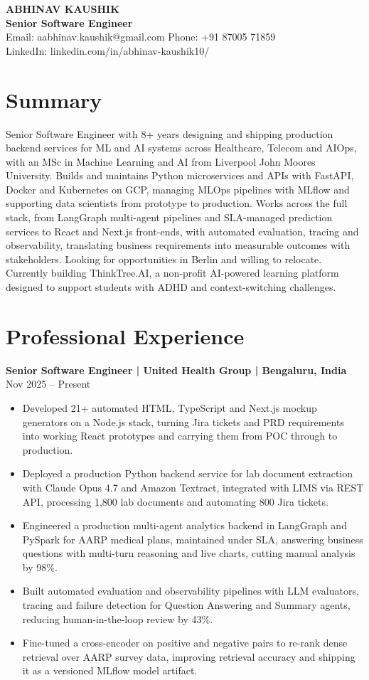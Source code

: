 \documentclass[10pt,a4paper]{article}
\newcommand{\role}[2]{\textbf{#1} \hfill #2\par}
\begin{document}
\begin{center}
  {\Large\bfseries ABHINAV KAUSHIK}\\[1pt]
  \textbf{Senior Software Engineer}\\[1pt]
  Email: aabhinav.kaushik@gmail.com \quad Phone: +91 87005 71859\\
  LinkedIn: linkedin.com/in/abhinav-kaushik10/
\end{center}

\section{Summary}
Senior Software Engineer with 8+ years designing and shipping production backend services for ML and AI systems
across Healthcare, Telecom and AIOps, with an MSc in Machine Learning and AI from Liverpool John Moores University.
Builds and maintains Python microservices and APIs with FastAPI, Docker and Kubernetes on GCP, managing MLOps
pipelines with MLflow and supporting data scientists from prototype to production. Works across the full stack, from
LangGraph multi-agent pipelines and SLA-managed prediction services to React and Next.js front-ends, with automated
evaluation, tracing and observability, translating business requirements into measurable outcomes with stakeholders. Looking for
opportunities in Berlin and willing to relocate. Currently building ThinkTree.AI, a non-profit AI-powered learning
platform designed to support students with ADHD and context-switching challenges.

\section{Professional Experience}
\role{Senior Software Engineer | United Health Group | Bengaluru, India}{Nov 2025 -- Present}
\begin{itemize}
  \item Developed 21+ automated HTML, TypeScript and Next.js mockup generators on a Node.js stack, turning Jira
  tickets and PRD requirements into working React prototypes and carrying them from POC through to production.
  \item Deployed a production Python backend service for lab document extraction with Claude Opus 4.7 and Amazon
  Textract, integrated with LIMS via REST API, processing 1,800 lab documents and automating 800 Jira tickets.
  \item Engineered a production multi-agent analytics backend in LangGraph and PySpark for AARP medical plans,
  maintained under SLA, answering business questions with multi-turn reasoning and live charts, cutting manual
  analysis by 98\%.
  \item Built automated evaluation and observability pipelines with LLM evaluators, tracing and failure detection
  for Question Answering and Summary agents, reducing human-in-the-loop review by 43\%.
  \item Fine-tuned a cross-encoder on positive and negative pairs to re-rank dense retrieval over AARP survey data,
  improving retrieval accuracy and shipping it as a versioned MLflow model artifact.
\end{itemize}
\vspace{3pt}
\end{document}

